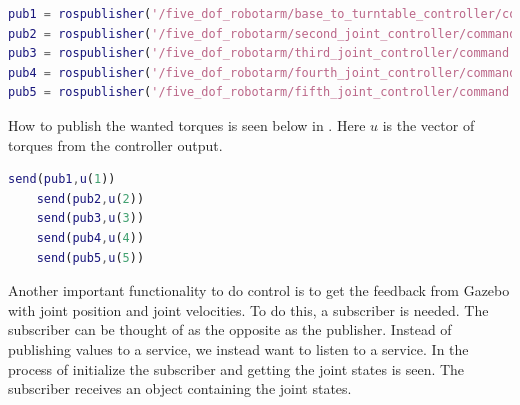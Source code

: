 \begin{lstlisting}[language=Matlab,caption={MATLAB code for creating the publishers.},label={lst:matlabPubl}]
pub1 = rospublisher('/five_dof_robotarm/base_to_turntable_controller/command','std_msgs/Float64');
pub2 = rospublisher('/five_dof_robotarm/second_joint_controller/command','std_msgs/Float64');
pub3 = rospublisher('/five_dof_robotarm/third_joint_controller/command','std_msgs/Float64');
pub4 = rospublisher('/five_dof_robotarm/fourth_joint_controller/command','std_msgs/Float64');
pub5 = rospublisher('/five_dof_robotarm/fifth_joint_controller/command','std_msgs/Float64');
\end{lstlisting}

How to publish the wanted torques is seen below in . Here $u$ is the vector of torques from the controller output. 
\begin{lstlisting}[language=Matlab,caption={MATLAB code for publish wanted joint torques},label={lst:matlabPubs}]
    send(pub1,u(1))
    send(pub2,u(2))
    send(pub3,u(3))
    send(pub4,u(4))
    send(pub5,u(5))
\end{lstlisting}

Another important functionality to do control is to get the feedback from Gazebo with joint position and joint velocities. To do this, a subscriber is needed. The subscriber can be thought of as the opposite as the publisher. Instead of publishing values to a service, we instead want to listen to a service. In  the process of initialize the subscriber and getting the joint states is seen. The subscriber receives an object containing the joint states. 

